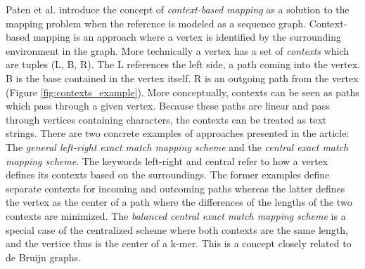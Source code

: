 \documentclass[thesis.tex]{subfiles}
\begin{document}
Paten et al. \cite{mapping_to_a_reference_genome_structure} introduce the concept of \textit{context-based mapping} as a solution to the mapping problem when the reference is modeled as a sequence graph. Context-based mapping is an approach where a vertex is identified by the surrounding environment in the graph. More technically a vertex has a set of \textit{contexts} which are tuples (L, B, R). The L references the left side, a path coming into the vertex. B is the base contained in the vertex itself. R is an outgoing path from the vertex (Figure \ref{fig:contexts_example}). More conceptually, contexts can be seen as paths which pass through a given vertex. Because these paths are linear and pass through vertices containing characters, the contexts can be treated as text strings. There are two concrete examples of approaches presented in the article: The \textit{general left-right exact match mapping scheme} and the \textit{central exact match mapping scheme}. The keywords left-right and central refer to how a vertex defines its contexts based on the surroundings. The former examples define separate contexts for incoming and outcoming paths whereas the latter defines the vertex as the center of a path where the differences of the lengths of the two contexts are minimized. The \textit{balanced central exact match mapping scheme} is a special case of the centralized scheme where both contexts are the same length, and the vertice thus is the center of a k-mer. This is a concept closely related to de Bruijn graphs.\\
\par\noindent
\end{document}
